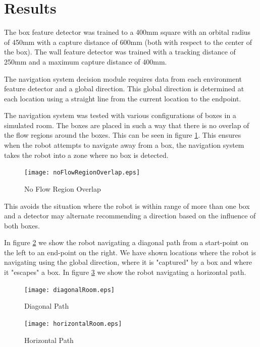 \documentclass[journal]{IEEEtran}
\begin{document}
\section{Results}
\label{sec:Results}
The box feature detector was trained to a 400mm square with an orbital radius of 450mm with a capture distance of 600mm (both with
respect to the center of the box).
The wall feature detector was trained with a tracking distance of 250mm and a maximum capture distance of 400mm.

The navigation system decision module requires data from each environment feature detector and a global direction.
This global direction is determined at each location using a straight line from the current location to the endpoint.

The navigation system was tested with various configurations of boxes in a simulated room. The boxes are placed in such a way that there is no overlap of
the flow regions around the boxes.  This can be seen in figure \ref{fig:no flow region overlap}.
This ensures when the robot attempts to navigate away from a box,
the navigation system takes the robot into a zone where no box is detected.
\begin{figure}[!t]
\centerline{
\mbox{\texttt{[image: noFlowRegionOverlap.eps]}}
}
\caption{No Flow Region Overlap}
\label{fig:no flow region overlap}
\end{figure}
This avoids the situation where the robot is within range of more than one box and a detector may alternate recommending a direction based on the influence
of both boxes.

In figure \ref{fig:Diagonal Path} we show the robot navigating a diagonal path from a start-point on the left to an end-point on the right.
We have shown locations where the robot is navigating using the global direction, where it is "captured" by a box and where it
"escapes" a box.
In figure \ref{fig:Horizontal Path} we show the robot navigating a horizontal path.
\begin{figure}[!t]
\centerline{
\mbox{\texttt{[image: diagonalRoom.eps]}}
}
\caption{Diagonal Path}
\label{fig:Diagonal Path}
\end{figure}
\begin{figure}[!t]
\centerline{
\mbox{\texttt{[image: horizontalRoom.eps]}}
}
\caption{Horizontal Path}
\label{fig:Horizontal Path}
\end{figure}
\end{document}
